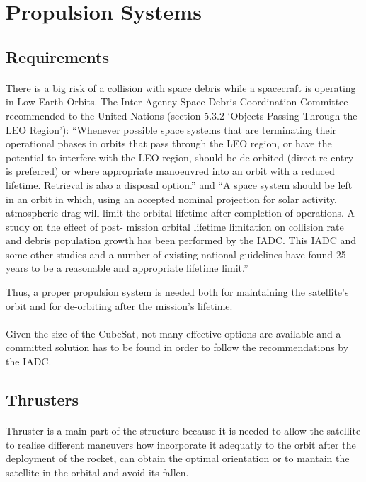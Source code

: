 \section{Propulsion Systems}

\subsection{Requirements}

\paragraph{}
There is a big risk of a collision with space debris while a spacecraft is operating in Low Earth Orbits. The Inter-Agency Space Debris Coordination Committee recommended to the United Nations (section 5.3.2 ‘Objects Passing Through the LEO Region’): “Whenever possible space systems that are terminating their operational phases in orbits that pass through the LEO region, or have the potential to interfere with the LEO region, should be de-orbited (direct re-entry is preferred) or where appropriate manoeuvred into an orbit with a reduced lifetime. Retrieval is also a disposal option.” and “A space system should be left in an orbit in which, using an accepted nominal projection for solar activity, atmospheric drag will limit the orbital lifetime after completion of operations. A study on the effect of post- mission orbital lifetime limitation on collision rate and debris population growth has been performed by the IADC. This IADC and some other studies and a number of existing national guidelines have found 25 years to be a reasonable and appropriate lifetime limit.” \cite{collisionLEO}

Thus, a proper propulsion system is needed both for maintaining the satellite's orbit and for de-orbiting after the mission's lifetime.

\paragraph{}
Given the size of the CubeSat, not many effective options are available and a committed solution has to be found in order to follow the recommendations by the IADC.


\subsection{Thrusters}

\paragraph{}
Thruster is a main part of the structure because it is needed to allow the satellite to realise different maneuvers how incorporate it adequatly to the orbit after the deployment of the rocket, can obtain the optimal orientation or to mantain the satellite in the orbital and avoid its fallen. 

